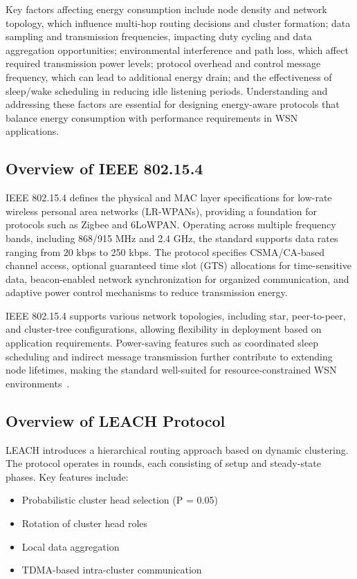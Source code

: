 \documentclass[conference]{IEEEtran}
\begin{document}
Key factors affecting energy consumption include node density and network topology, which influence multi-hop routing decisions and cluster formation; data sampling and transmission frequencies, impacting duty cycling and data aggregation opportunities; environmental interference and path loss, which affect required transmission power levels; protocol overhead and control message frequency, which can lead to additional energy drain; and the effectiveness of sleep/wake scheduling in reducing idle listening periods. Understanding and addressing these factors are essential for designing energy-aware protocols that balance energy consumption with performance requirements in WSN applications.

\subsection{Overview of IEEE 802.15.4}

IEEE 802.15.4 defines the physical and MAC layer specifications for low-rate wireless personal area networks (LR-WPANs), providing a foundation for protocols such as Zigbee and 6LoWPAN. Operating across multiple frequency bands, including 868/915 MHz and 2.4 GHz, the standard supports data rates ranging from 20 kbps to 250 kbps. The protocol specifies CSMA/CA-based channel access, optional guaranteed time slot (GTS) allocations for time-sensitive data, beacon-enabled network synchronization for organized communication, and adaptive power control mechanisms to reduce transmission energy.

IEEE 802.15.4 supports various network topologies, including star, peer-to-peer, and cluster-tree configurations, allowing flexibility in deployment based on application requirements. Power-saving features such as coordinated sleep scheduling and indirect message transmission further contribute to extending node lifetimes, making the standard well-suited for resource-constrained WSN environments~\cite{ieee_standard}.

\subsection{Overview of LEACH Protocol}
LEACH introduces a hierarchical routing approach based on dynamic clustering. The protocol operates in rounds, each consisting of setup and steady-state phases. Key features include:

\begin{itemize}
    \item Probabilistic cluster head selection (P = 0.05)
    \item Rotation of cluster head roles
    \item Local data aggregation
    \item TDMA-based intra-cluster communication
\end{itemize}
\end{document}
